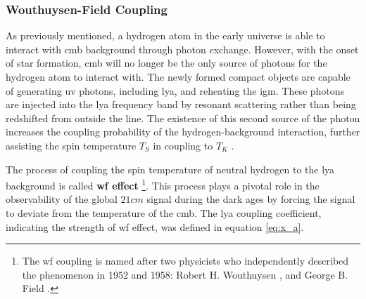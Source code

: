\documentclass[12pt, TexShade, letterpaper]{report}
\begin{document}
\subsubsection{Wouthuysen-Field Coupling}
As previously mentioned, a hydrogen atom in the early universe is able to interact with \gls{cmb} background through photon exchange. However, with the onset of star formation, \gls{cmb} will no longer be the only source of photons for the hydrogen atom to interact with. The newly formed compact objects are capable of generating \gls{uv} photons, including \gls{lya}, and reheating the \gls{igm}. These photons are injected into the \gls{lya} frequency band by resonant scattering rather than being redshifted from outside the line. The existence of this second source of the photon increases the coupling probability of the hydrogen-background interaction, further assisting the spin temperature $T_S$ in coupling to $T_K$ \cite{21century, low_frequency}.\par
The process of coupling the spin temperature of neutral hydrogen to the \gls{lya} background is called \textbf{\gls{wf} effect} \cite{barkana2001beginning}\footnote{The \gls{wf} coupling is named after two physicists who independently described the phenomenon in 1952 and 1958: Robert H. Wouthuysen \cite{wouthuysen_original}, and George B. Field \cite{field_original}.}. This process plays a pivotal role in the observability of the global $21cm$ signal during the dark ages by forcing the signal to deviate from the temperature of the \gls{cmb}. The \gls{lya} coupling coefficient, indicating the strength of \gls{wf} effect, was defined in equation \ref{eq:x_a}. \par
\end{document}
